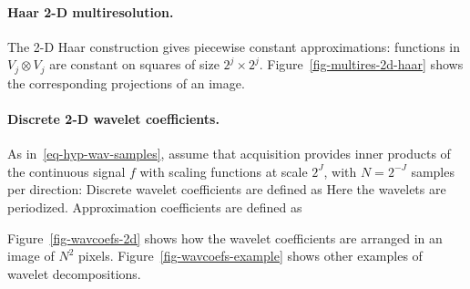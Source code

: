 

\paragraph{Haar 2-D multiresolution.}

The 2-D Haar construction gives piecewise constant approximations: functions in $V_j \otimes V_j$ are constant on squares of size $2^j \times 2^j$. Figure~\ref{fig-multires-2d-haar} shows the corresponding projections of an image.


\paragraph{Discrete 2-D wavelet coefficients.}

As in~\eqref{eq-hyp-wav-samples}, assume that acquisition provides inner products of the continuous signal $f$ with scaling functions at scale $2^J$, with $N=2^{-J}$ samples per direction:
Discrete wavelet coefficients are defined as
Here the wavelets are periodized.
%
Approximation coefficients are defined as


Figure~\ref{fig-wavcoefs-2d} shows how the wavelet coefficients are arranged in an image of $N^2$ pixels.
%
Figure~\ref{fig-wavcoefs-example} shows other examples of wavelet decompositions.

